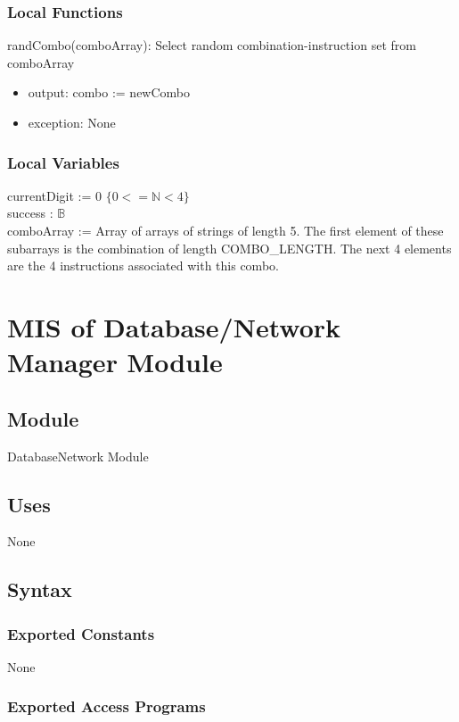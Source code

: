 \documentclass[12pt, titlepage]{article}
\begin{document}
\subsubsection{Local Functions}
randCombo(comboArray): Select random combination-instruction set from comboArray
\begin{itemize}
    \item output: combo := newCombo
    \item exception: None
\end{itemize}

\subsubsection{Local Variables}
currentDigit := 0 $\{0<=\mathbb{N}<4\}$\\
success : $\mathds{B}$\\
comboArray := Array of arrays of strings of length 5. The first element of these subarrays is the combination of length COMBO\_LENGTH. The next 4 elements are the 4 instructions associated with this combo.\\
\newpage

\section{MIS of Database/Network Manager Module} \label{DatabaseNetworkModule} 

\subsection{Module}

DatabaseNetwork Module

\subsection{Uses}

None

\subsection{Syntax}

\subsubsection{Exported Constants}

None

\subsubsection{Exported Access Programs}
\end{document}
